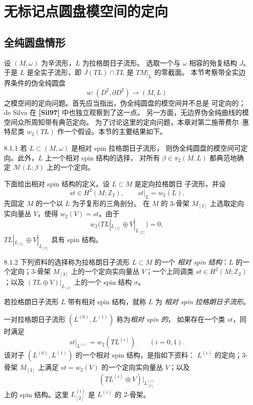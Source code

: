 
\section{无标记点圆盘模空间的定向}
\label{sec:8-1}

\subsection{全纯圆盘情形}
\label{subsec:8-1-1}

设 $(M,\omega)$ 为辛流形，$L$ 为拉格朗日子流形。
选取一个与 $\omega$ 相容的殆复结构 $J$。
于是 $L$ 是全实子流形，即 $J(TL)\cap TL$ 是 $TM|_L$ 的零截面。
本节考察带全实边界条件的伪全纯圆盘
\[
w\colon(D^2,\partial D^2)\longrightarrow(M,L)
\]
之模空间的定向问题。首先应当指出，伪全纯圆盘的模空间并不总是
可定向的；de Silva 在 \textbf{[Sil97]} 中也独立观察到了这一点。
另一方面，无边界伪全纯曲线的模空间众所周知带有典范定向。
为了讨论这里的定向问题，本章对第二施蒂费尔--惠特尼类
$w_2(TL)$ 作一个假设。本节的主要结果如下。

\begin{theorem}{8.1.1}\label{thm:8-1-1}
若 $L\subset(M,\omega)$ 是相对 spin 拉格朗日子流形，
则伪全纯圆盘的模空间可定向。此外，$L$ 上一个相对 spin 结构的选择，
对所有 $\beta\in\pi_2(M,L)$ 都典范地确定 $\mathcal M(L;\beta)$
上的一个定向。
\end{theorem}

下面给出相对 spin 结构的定义。设 $L\subset M$ 是定向拉格朗日
子流形，并设
\[
st\in H^2(M;\mathbb Z_2),\qquad st|_L=w_2(L).
\]
先固定 $M$ 的一个以 $L$ 为子复形的三角剖分。
在 $M$ 的 $3$-骨架 $M_{[3]}$ 上选取定向实向量丛 $V$，使得
$w_2(V)=st$。由于
\[
w_2\bigl(TL|_{L_{[2]}}\oplus V|_{L_{[2]}}\bigr)=0,
\]
$TL|_{L_{[2]}}\oplus V|_{L_{[2]}}$ 具有 spin 结构。

\begin{definition}{8.1.2}\label{def:8-1-2}
下列资料的选择称为拉格朗日子流形 $L\subset M$ 的一个
\emph{相对 spin 结构}：$L$ 的一个定向；$3$-骨架 $M_{[3]}$
上的一个定向实向量丛 $V$；一个上同调类
$st\in H^2(M;\mathbb Z_2)$；以及
$(TL\oplus V)|_{L_{[2]}}$ 上的一个 spin 结构 $\sigma$。
\end{definition}

若拉格朗日子流形 $L$ 带有相对 spin 结构，就称 $L$ 为
\emph{相对 spin 拉格朗日子流形}。

一对拉格朗日子流形 $(L^{(0)},L^{(1)})$ 称为\emph{相对 spin 的}，
如果存在一个类 $st$，同时满足
\[
st|_{L^{(i)}}=w_2(TL^{(i)})\qquad(i=0,1).
\]
该对子 $(L^{(0)},L^{(1)})$ 的一个相对 spin 结构，是指如下资料：
$L^{(i)}$ 的定向；$3$-骨架 $M_{[3]}$ 上满足 $st=w_2(V)$
的一个定向实向量丛 $V$；以及
\[
(TL^{(i)}\oplus V)|_{L^{(i)}_{[2]}}
\]
上的 spin 结构。这里 $L^{(i)}_{[2]}$ 是 $L^{(i)}$ 的 $2$-骨架。

